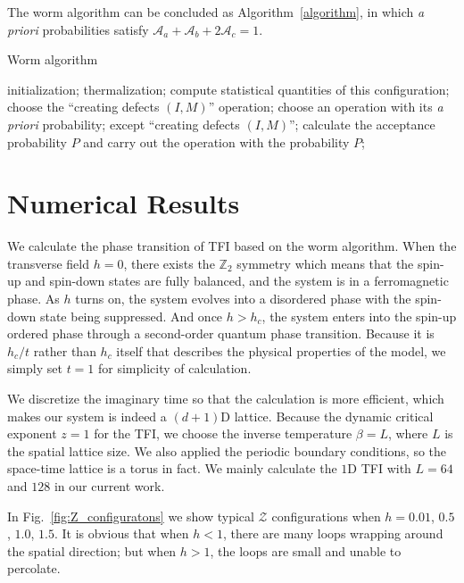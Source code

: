 \documentclass{article}
\theoremstyle{plain} \newtheorem{thm}{Theorem}[section]
\theoremstyle{definition} \newtheorem{df}{Definition}[section]
\theoremstyle{definition} \newtheorem{eg}{Example}
\theoremstyle{remark} \newtheorem*{rmk}{Remark}
\begin{document}
The worm algorithm can be concluded as Algorithm~\ref{algorithm}, in which \textit{a priori} probabilities satisfy $\mathcal{A}_a+\mathcal{A}_b+2\mathcal{A}_c = 1$.\\
\begin{minipage}{\linewidth}
  \begin{algorithm}[H]
  \caption{Worm algorithm}
  \label{algorithm}
  \begin{algorithmic}
    \STATE initialization;
    \STATE thermalization;
    \LOOP
        \STATE compute statistical quantities of this configuration;
        \STATE choose the ``creating defects $(I, M)$'' operation;
      \ELSE
        \STATE  choose an operation with its \textit{a priori}  probability;
        except ``creating defects $(I, M)$'';
      \ENDIF
      \STATE calculate the acceptance probability $P$ and carry out the operation with the probability $P$;
    \ENDLOOP
  \end{algorithmic}
\end{algorithm}
\end{minipage}
\vspace{3mm}

\section{Numerical Results}
We calculate the phase transition of TFI based on the worm algorithm. When the transverse field $h = 0$, there exists the $\mathbb{Z}_2$ symmetry which means that the spin-up and spin-down states are fully balanced, and the system is in a ferromagnetic phase. As $h$ turns on, the system evolves into a disordered phase with the spin-down state being suppressed. And once $h > h_c$, the system enters into the spin-up ordered phase through a second-order quantum phase transition. Because it is $h_c/t$ rather than $h_c$ itself that describes the physical properties of the model, we simply set $t = 1$ for simplicity of calculation.

We discretize the imaginary time so that the calculation is more efficient, which makes our system is indeed a $(d+1)$D lattice. Because the dynamic critical exponent $z = 1$ for the TFI, we choose the inverse temperature $\beta = L$, where $L$ is the spatial lattice size. We also applied the periodic boundary conditions, so the space-time lattice is a torus in fact. We mainly calculate the $1$D TFI with $L = 64$ and $128$ in our current work.

In Fig.~\ref{fig:Z_configuratons} we show typical $\mathcal{Z}$ configurations when $h = 0.01$, $0.5$, $1.0$, $1.5$. It is obvious that when $h < 1$, there are many loops wrapping around the spatial direction; but when $h > 1$, the loops are small and unable to percolate.
\end{document}
